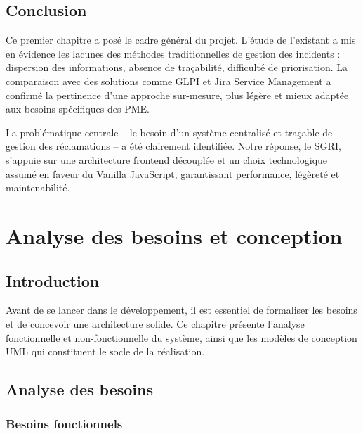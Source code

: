 \documentclass[12pt,a4paper,twoside]{report}
\begin{document}
\section{Conclusion}

Ce premier chapitre a posé le cadre général du projet. L'étude de l'existant a mis en évidence les lacunes des méthodes traditionnelles de gestion des incidents : dispersion des informations, absence de traçabilité, difficulté de priorisation. La comparaison avec des solutions comme GLPI et Jira Service Management a confirmé la pertinence d'une approche sur-mesure, plus légère et mieux adaptée aux besoins spécifiques des PME.

La problématique centrale -- le besoin d'un système centralisé et traçable de gestion des réclamations -- a été clairement identifiée. Notre réponse, le SGRI, s'appuie sur une architecture frontend découplée et un choix technologique assumé en faveur du Vanilla JavaScript, garantissant performance, légèreté et maintenabilité.

\chapter{Analyse des besoins et conception}

\section{Introduction}

Avant de se lancer dans le développement, il est essentiel de formaliser les besoins et de concevoir une architecture solide. Ce chapitre présente l'analyse fonctionnelle et non-fonctionnelle du système, ainsi que les modèles de conception UML qui constituent le socle de la réalisation.

\section{Analyse des besoins}

\subsection{Besoins fonctionnels}
\end{document}
